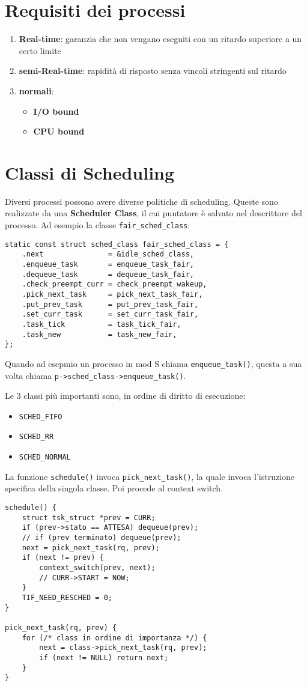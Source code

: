 \documentclass[12pt, a4paper]{report}
\begin{document}
\section{Requisiti dei processi}
\begin{enumerate}
	\item \textbf{Real-time}: garanzia che non vengano eseguiti con un ritardo
		superiore a un certo limite
	\item \textbf{semi-Real-time}: rapidità di risposto senza vincoli
		stringenti sul ritardo
	\item \textbf{normali}:
		\begin{itemize}
			\item \textbf{I/O bound}
			\item \textbf{CPU bound}
		\end{itemize}
\end{enumerate}

\section{Classi di Scheduling}
Diversi processi possono avere diverse politiche di scheduling. Queste sono
realizzate da una \textbf{Scheduler Class}, il cui puntatore è salvato nel
descrittore del processo. Ad esempio la classe \texttt{fair\_sched\_class}:
\begin{verbatim}
static const struct sched_class fair_sched_class = {
    .next               = &idle_sched_class,
    .enqueue_task       = enqueue_task_fair,
    .dequeue_task       = dequeue_task_fair,
    .check_preempt_curr = check_preempt_wakeup,
    .pick_next_task     = pick_next_task_fair,
    .put_prev_task      = put_prev_task_fair,
    .set_curr_task      = set_curr_task_fair,
    .task_tick          = task_tick_fair,
    .task_new           = task_new_fair,
};
\end{verbatim}
Quando ad esepmio un processo in mod S chiama \texttt{enqueue\_task()}, questa a
sua volta chiama \texttt{p->sched\_class->enqueue\_task()}.

Le 3 classi più importanti sono, in ordine di diritto di esecuzione:
\begin{itemize}
	\item \texttt{SCHED\_FIFO}
	\item \texttt{SCHED\_RR}
	\item \texttt{SCHED\_NORMAL}
\end{itemize}
La funzione \texttt{schedule()} invoca \texttt{pick\_next\_task()}, la quale
invoca l'istruzione specifica della singola classe. Poi procede al context
switch.
\begin{verbatim}
schedule() {
	struct tsk_struct *prev = CURR;
	if (prev->stato == ATTESA) dequeue(prev);
	// if (prev terminato) dequeue(prev);
	next = pick_next_task(rq, prev);
	if (next != prev) {
		context_switch(prev, next);
		// CURR->START = NOW;
	}
	TIF_NEED_RESCHED = 0;
}

pick_next_task(rq, prev) {
	for (/* class in ordine di importanza */) {
		next = class->pick_next_task(rq, prev);
		if (next != NULL) return next;
	}
}
\end{verbatim}
\end{document}
